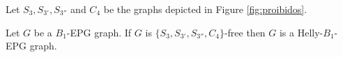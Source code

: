 Let $S_{3}, S_{3'}, S_{3''}$ and $ C_{4}$ be the graphs depicted in Figure \ref{fig:proibidos}. 


\begin{theorem}
\label{lem:chordalDiamondFree}
Let $G$ be a $B_1$-EPG graph. If $G$ is  $\{S_{3}, S_{3'}, S_{3''}, C_{4}\}$-free then $G$  is a Helly-$B_1$-EPG graph.
\end{theorem}



 
 
